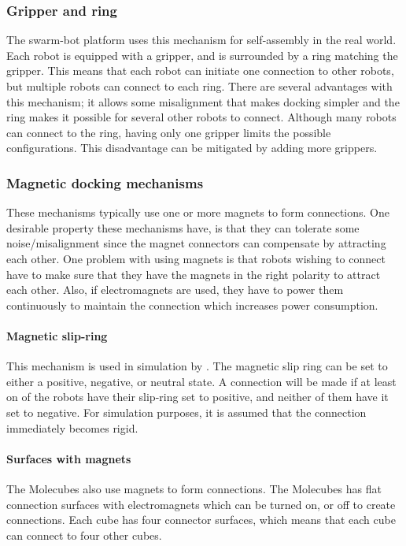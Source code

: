 \subsubsection*{Gripper and ring}
The swarm-bot platform\cite{gro_autonomous_2006} uses this mechanism for self-assembly in the real world.
Each robot is equipped with a gripper, and is surrounded by a ring matching the gripper. 
This means that each robot can initiate one connection to other robots, but multiple robots can connect to each ring.
There are several advantages with this mechanism; it allows some misalignment that makes docking simpler and the ring makes it possible for several other robots to connect.
Although many robots can connect to the ring, having only one gripper limits the possible configurations.
This disadvantage can be mitigated by adding more grippers.

\subsubsection*{Magnetic docking mechanisms}
These mechanisms typically use one or more magnets to form connections.
One desirable property these mechanisms have, is that they can tolerate some noise/misalignment since the magnet connectors can compensate by attracting each other.
One problem with using magnets is that robots wishing to connect have to make sure that they have the magnets in the right polarity to attract each other.
Also, if electromagnets are used, they have to power them continuously to maintain the connection which increases power consumption.

\paragraph*{Magnetic slip-ring}
This mechanism is used in simulation by \cite{weel_emergence_2012}.
The magnetic slip ring can be set to either a positive, negative, or neutral state.
A connection will be made if at least on of the robots have their slip-ring set to positive, and neither of them have it set to negative.
For simulation purposes, it is assumed that the connection immediately becomes rigid.

\paragraph*{Surfaces with magnets}
The Molecubes\cite{studer_spontaneous_2006} also use magnets to form connections.
The Molecubes has flat connection surfaces with electromagnets which can be turned on, or off to create connections.
Each cube has four connector surfaces, which means that each cube can connect to four other cubes.


